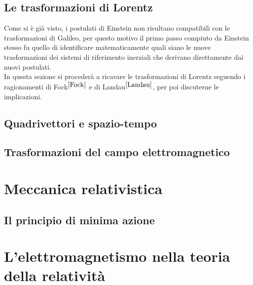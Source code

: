 \documentclass[12pt,a4paper]{report}
\numberwithin{equation}{section}
\begin{document}
\begin{sloppypar}
\section{Le trasformazioni di Lorentz}
Come si è già visto, i postulati di Einstein non risultano compatibili con le trasformazioni di Galileo, 
per questo motivo il primo passo compiuto da Einstein stesso fu quello di identificare matematicamente quali siano 
le nuove trasformazioni dei sistemi di riferimento inerziali che derivano direttamente dai nuovi postulati.\\
In questa sezione si procederà a ricavare le trasformazioni di Lorentz seguendo i ragionamenti di Fock$^{\cite{Fock}}$ e di Landau$ ^{\cite{Landau}}$, 
per poi discuterne le implicazioni.  




\section{Quadrivettori e spazio-tempo}


\section{Trasformazioni del campo elettromagnetico}


\chapter{Meccanica relativistica}
\section{Il principio di minima azione}


\chapter{L'elettromagnetismo nella teoria della relatività}

\appendix





\end{sloppypar}
\end{document}
